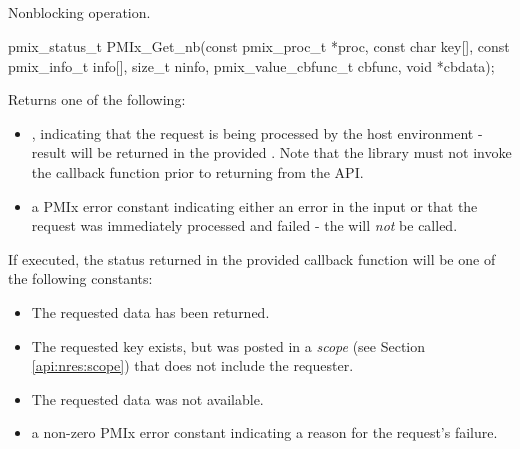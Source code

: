 \subsection{}

\summary

Nonblocking  operation.

\format

\cspecificstart
\begin{codepar}
pmix_status_t
PMIx_Get_nb(const pmix_proc_t *proc, const char key[],
            const pmix_info_t info[], size_t ninfo,
            pmix_value_cbfunc_t cbfunc, void *cbdata);
\end{codepar}
\cspecificend

\begin{arglist}
\end{arglist}

Returns one of the following:

\begin{itemize}
    \item {}, indicating that the request is being processed by the host environment - result will be returned in the provided . Note that the library must not invoke the callback function prior to returning from the \ac{API}.
    \item a \ac{PMIx} error constant indicating either an error in the input or that the request was immediately processed and failed - the  will \textit{not} be called.
\end{itemize}

If executed, the status returned in the provided callback function will be one of the following constants:

\begin{itemize}
\item {} The requested data has been returned.
\item {} The requested key exists, but was posted in a \emph{scope} (see Section \ref{api:nres:scope}) that does not include the requester.
\item {} The requested data was not available.
\item a non-zero \ac{PMIx} error constant indicating a reason for the request's failure.
\end{itemize}

